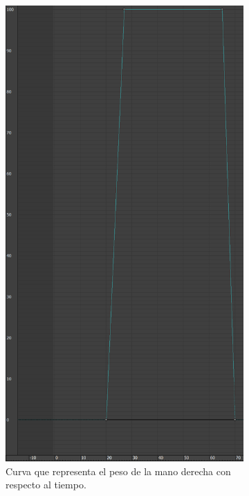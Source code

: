 \begin{figure}[H]
    \hfill
     \begin{subfigure}[t]{0.27\textwidth}
        \centering
        \includegraphics[width=\textwidth]{imagenes/espada/peso1.png}
        \caption{Curva que representa el peso de la mano derecha con respecto al tiempo.}
     \end{subfigure}
    \hfill
     \begin{subfigure}[t]{0.27\textwidth}

\end{subfigure}
\end{figure}
